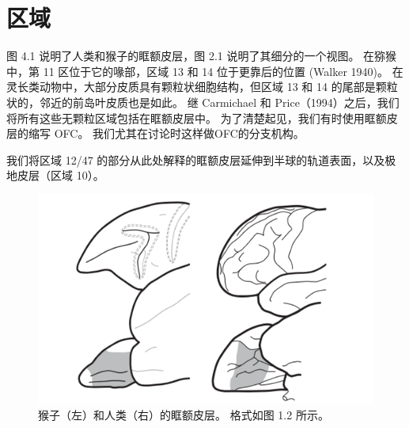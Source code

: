 \section{区域}
图 4.1 说明了人类和猴子的眶额皮层，图 2.1 说明了其细分的一个视图。 在猕猴中，第 11 区位于它的喙部，区域 13 和 14 位于更靠后的位置 (Walker 1940)。 在灵长类动物中，大部分皮质具有颗粒状细胞结构，但区域 13 和 14 的尾部是颗粒状的，邻近的前岛叶皮质也是如此。 继 Carmichael 和 Price（1994）之后，我们将所有这些无颗粒区域包括在眶额皮层中。 为了清楚起见，我们有时使用眶额皮层的缩写 OFC。 我们尤其在讨论时这样做OFC的分支机构。\par
我们将区域 12/47 的部分从此处解释的眶额皮层延伸到半球的轨道表面，以及极地皮层（区域 10）。
\begin{figure}[!htb]
	\centering
	\includegraphics{image_pfc/Fig_4_1}
	\caption{猴子（左）和人类（右）的眶额皮层。 格式如图 1.2 所示。}
\end{figure}


